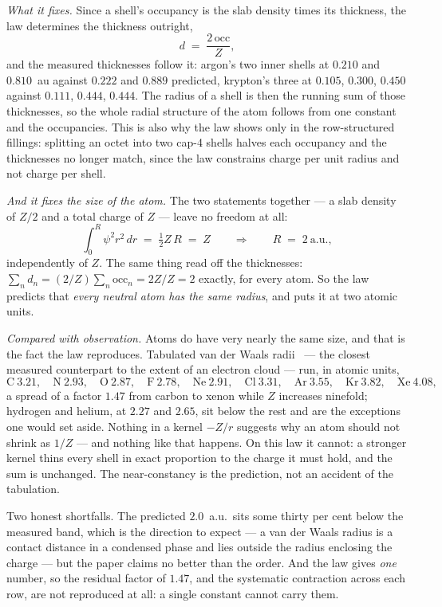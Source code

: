 \documentclass[11pt]{article}
\begin{document}
\emph{What it fixes.} Since a shell's occupancy is the slab density times its thickness, the law
determines the thickness outright,
\[
d \;=\; \frac{2\,\mathrm{occ}}{Z} ,
\]
and the measured thicknesses follow it: argon's two inner shells at $0.210$ and $0.810$~au against
$0.222$ and $0.889$ predicted, krypton's three at $0.105$, $0.300$, $0.450$ against $0.111$, $0.444$,
$0.444$. The radius of a shell is then the running sum of those thicknesses, so the whole radial
structure of the atom follows from one constant and the occupancies. This is also why the law shows
only in the row-structured fillings: splitting an octet into two cap-4 shells halves each occupancy
and the thicknesses no longer match, since the law constrains charge per unit radius and not charge
per shell.

\emph{And it fixes the size of the atom.} The two statements together --- a slab density of $Z/2$ and
a total charge of $Z$ --- leave no freedom at all:
\[
\int_0^{R} \psi^2r^2\,dr \;=\; \tfrac12 Z\,R \;=\; Z
\qquad\Longrightarrow\qquad
R \;=\; 2\ \text{a.u.},
\]
independently of $Z$. The same thing read off the thicknesses: $\sum_n d_n = (2/Z)\sum_n
\mathrm{occ}_n = 2Z/Z = 2$ exactly, for every atom. So the law predicts that \emph{every neutral atom
has the same radius}, and puts it at two atomic units.

\emph{Compared with observation.} Atoms do have very nearly the same size, and that is the fact the
law reproduces. Tabulated van der Waals radii~\cite{Bondi1964} --- the closest measured counterpart
to the extent of an electron cloud --- run, in atomic units,
\[
\mathrm{C}\ 3.21,\quad \mathrm{N}\ 2.93,\quad \mathrm{O}\ 2.87,\quad \mathrm{F}\ 2.78,\quad
\mathrm{Ne}\ 2.91,\quad \mathrm{Cl}\ 3.31,\quad \mathrm{Ar}\ 3.55,\quad \mathrm{Kr}\ 3.82,\quad
\mathrm{Xe}\ 4.08 ,
\]
a spread of a factor $1.47$ from carbon to xenon while $Z$ increases ninefold; hydrogen and helium,
at $2.27$ and $2.65$, sit below the rest and are the exceptions one would set aside. Nothing in a
kernel $-Z/r$ suggests why an atom should not shrink as $1/Z$ --- and nothing like that happens. On
this law it cannot: a stronger kernel thins every shell in exact proportion to the charge it must
hold, and the sum is unchanged. The near-constancy is the prediction, not an accident of the
tabulation.

Two honest shortfalls. The predicted $2.0$~a.u.\ sits some thirty per cent below the measured band,
which is the direction to expect --- a van der Waals radius is a contact distance in a condensed
phase and lies outside the radius enclosing the charge --- but the paper claims no better than the
order. And the law gives \emph{one} number, so the residual factor of $1.47$, and the systematic
contraction across each row, are not reproduced at all: a single constant cannot carry them.
\end{document}
